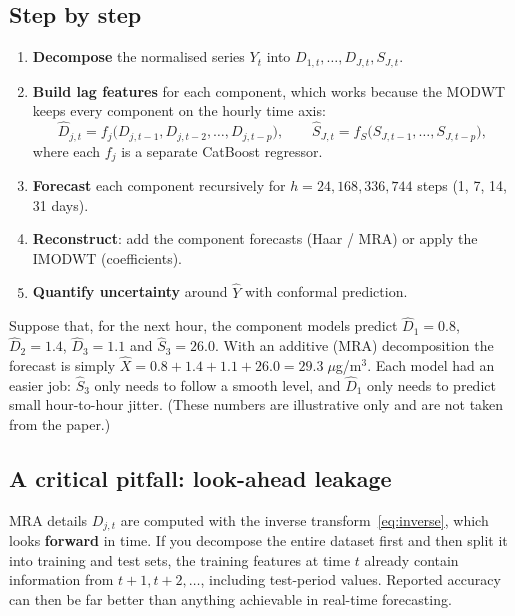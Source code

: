\documentclass[11pt,a4paper]{article}
\begin{document}
\subsection{Step by step}

\begin{enumerate}[leftmargin=1.5em]
  \item \textbf{Decompose} the normalised series $Y_t$ into $D_{1,t},\dots,D_{J,t},S_{J,t}$.
  \item \textbf{Build lag features} for each component, which works because the MODWT keeps every component on the hourly time axis:
        \[
          \hat D_{j,t} = f_j\big(D_{j,t-1},D_{j,t-2},\dots,D_{j,t-p}\big),
          \qquad
          \hat S_{J,t} = f_S\big(S_{J,t-1},\dots,S_{J,t-p}\big),
        \]
        where each $f_j$ is a separate CatBoost regressor.
  \item \textbf{Forecast} each component recursively for $h = 24, 168, 336, 744$ steps (1, 7, 14, 31 days).
  \item \textbf{Reconstruct}: add the component forecasts (Haar / MRA) or apply the IMODWT (coefficients).
  \item \textbf{Quantify uncertainty} around $\hat Y$ with conformal prediction.
\end{enumerate}

\begin{examplebox}
Suppose that, for the next hour, the component models predict $\hat D_1=0.8$, $\hat D_2=1.4$, $\hat D_3=1.1$ and $\hat S_3=26.0$.
With an additive (MRA) decomposition the forecast is simply
$\hat X = 0.8+1.4+1.1+26.0 = 29.3\;\mu$g/m$^3$. Each model had an easier job: $\hat S_3$ only needs to follow a smooth
level, and $\hat D_1$ only needs to predict small hour-to-hour jitter. (These numbers are illustrative only and are not taken from the paper.)
\end{examplebox}

\subsection{A critical pitfall: look-ahead leakage}
\label{sec:leakage}

\begin{warnbox}
MRA details $D_{j,t}$ are computed with the inverse transform~\eqref{eq:inverse}, which looks \textbf{forward}
in time. If you decompose the entire dataset first and then split it into training and test sets, the training
features at time $t$ already contain information from $t+1, t+2,\dots$, including test-period values.
Reported accuracy can then be far better than anything achievable in real-time forecasting.
\end{warnbox}
\end{document}
